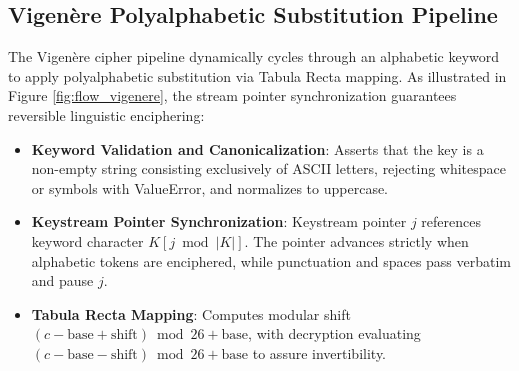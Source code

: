 \documentclass[12pt,a4paper]{report}
\renewcommand{\texttt}[1]{{\normalfont #1}}
\begin{document}
\clearpage

\subsection{Vigen\`ere Polyalphabetic Substitution Pipeline}
The Vigen\`ere cipher pipeline dynamically cycles through an alphabetic keyword to apply polyalphabetic substitution via Tabula Recta mapping. As illustrated in Figure \ref{fig:flow_vigenere}, the stream pointer synchronization guarantees reversible linguistic enciphering:
\begin{itemize}[leftmargin=1.5em,topsep=1pt,itemsep=1pt,parsep=0pt]
    \item \textbf{Keyword Validation and Canonicalization}: Asserts that the key is a non-empty string consisting exclusively of ASCII letters, rejecting whitespace or symbols with \texttt{ValueError}, and normalizes to uppercase.
    \item \textbf{Keystream Pointer Synchronization}: Keystream pointer $j$ references keyword character $K[j \bmod |K|]$. The pointer advances strictly when alphabetic tokens are enciphered, while punctuation and spaces pass verbatim and pause $j$.
    \item \textbf{Tabula Recta Mapping}: Computes modular shift $(c - \text{base} + \text{shift}) \bmod 26 + \text{base}$, with decryption evaluating $(c - \text{base} - \text{shift}) \bmod 26 + \text{base}$ to assure invertibility.
\end{itemize}
\end{document}
